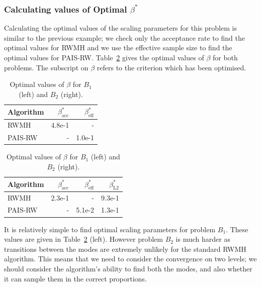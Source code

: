 \documentclass[final]{siamltex}
\begin{document}
\subsubsection{Calculating values of Optimal $\beta^*$}\label{sec:BM1_opt_beta}

Calculating the optimal values of the scaling parameters for this
problem is similar to the previous example; we check only the acceptance
rate to find the optimal values for RWMH and we use the effective
sample size to find the optimal values for PAIS-RW.
Table~\ref{table:BM_opt_beta} gives the optimal values of $\beta$ for both
problems. The subscript on $\beta$ refers to the criterion which has been optimised.

\begin{table}[!htb]
    \begin{minipage}{.5\linewidth}
      \centering
        \begin{tabular}{|l|r|r|}
	\hline
	Algorithm							& $\beta^*_{\text{acc}}$	& $\beta^*_{\text{eff}}$ \\ \hline
	RWMH								& 4.8e-1					& - \\
	PAIS-RW								& -						& 1.0e-1\\
	\hline
	\end{tabular}
    \end{minipage}%
    \begin{minipage}{.5\linewidth}
      \centering
        \begin{tabular}{|l|r|r|r|}
	\hline
	Algorithm							& $\beta^*_{\text{acc}}$	& $\beta^*_{\text{eff}}$	& $\beta^*_{\text{L2}}$ \\ \hline
	RWMH								& 2.3e-1					& - 						& 9.3e-1\\
	PAIS-RW								& -						& 5.1e-2 					& 1.3e-1\\
	\hline
	\end{tabular}
    \end{minipage}
	\vspace{1mm}
	\caption{Optimal values of $\beta$ for $B_1$ (left) and $B_2$ (right).}
	\label{table:BM_opt_beta}
\end{table}

It is relatively simple to find optimal scaling parameters for problem $B_1$.
These values are given in Table~\ref{table:BM_opt_beta} (left). However
problem $B_2$ is much harder as transitions between the modes are extremely
unlikely for the standard RWMH algorithm. This means that we need to consider the
convergence on two levels; we should consider the algorithm's ability
to find both the modes, and also whether it can sample them in the correct proportions.
\end{document}
